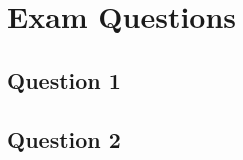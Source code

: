 \documentclass[10pt,ngerman]{scrartcl}
\begin{document}
\section*{Exam Questions}

\subsection*{Question 1}
\begin{answerbox}
  \hideit[2]{\lipsum[1-2]}
\end{answerbox}

\subsection*{Question 2}
\begin{answerbox}
  \hideit[2]{\lipsum[3-9]} %
\end{answerbox}
\end{document}
